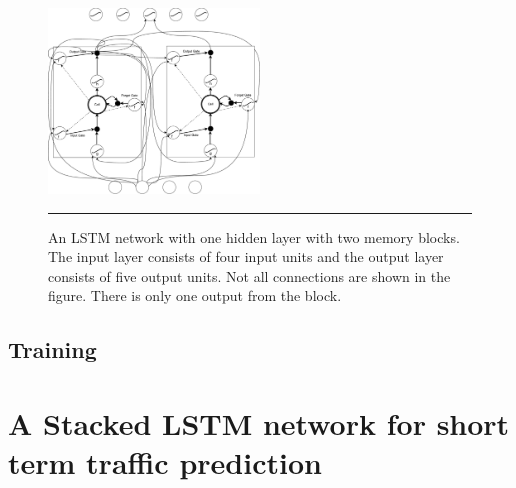 \begin{figure}[htbp]
  \centering
    \includegraphics[width=0.5\textwidth,height=0.5\textheight,keepaspectratio]{Figures/lstm-network.pdf}
    \rule{35em}{0.5pt}
  \caption[An LSTM network]
{An LSTM network with one hidden layer with two memory blocks. The input layer consists of
four input units and the output layer consists of five output units. Not all connections are
shown in the figure. There is only one output from the block.}
  \label{fig:lstmNetwork}
\end{figure}

\subsection{Training}

\section{A Stacked LSTM network for short term traffic prediction}
\label{sec:stackedLSTMTrafficPred}

